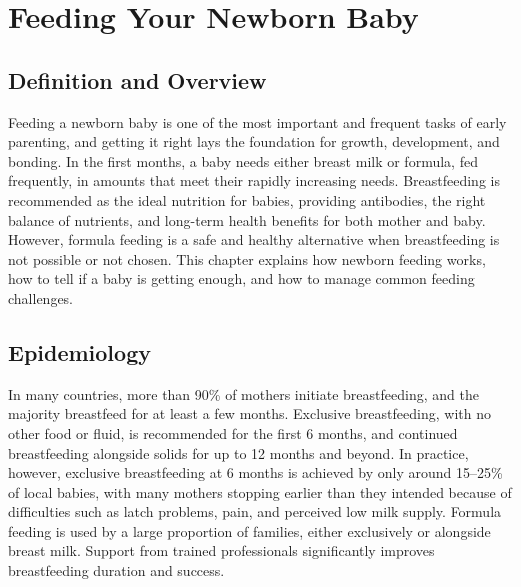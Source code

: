 \chapter{Feeding Your Newborn Baby}

\section*{Definition and Overview}
Feeding a newborn baby is one of the most important and frequent tasks of early parenting, and getting it right lays the foundation for growth, development, and bonding. In the first months, a baby needs either breast milk or formula, fed frequently, in amounts that meet their rapidly increasing needs. Breastfeeding is recommended as the ideal nutrition for babies, providing antibodies, the right balance of nutrients, and long-term health benefits for both mother and baby. However, formula feeding is a safe and healthy alternative when breastfeeding is not possible or not chosen. This chapter explains how newborn feeding works, how to tell if a baby is getting enough, and how to manage common feeding challenges.

\section*{Epidemiology}
In many countries, more than 90\% of mothers initiate breastfeeding, and the majority breastfeed for at least a few months. Exclusive breastfeeding, with no other food or fluid, is recommended for the first 6 months, and continued breastfeeding alongside solids for up to 12 months and beyond. In practice, however, exclusive breastfeeding at 6 months is achieved by only around 15--25\% of local babies, with many mothers stopping earlier than they intended because of difficulties such as latch problems, pain, and perceived low milk supply. Formula feeding is used by a large proportion of families, either exclusively or alongside breast milk. Support from trained professionals significantly improves breastfeeding duration and success.


